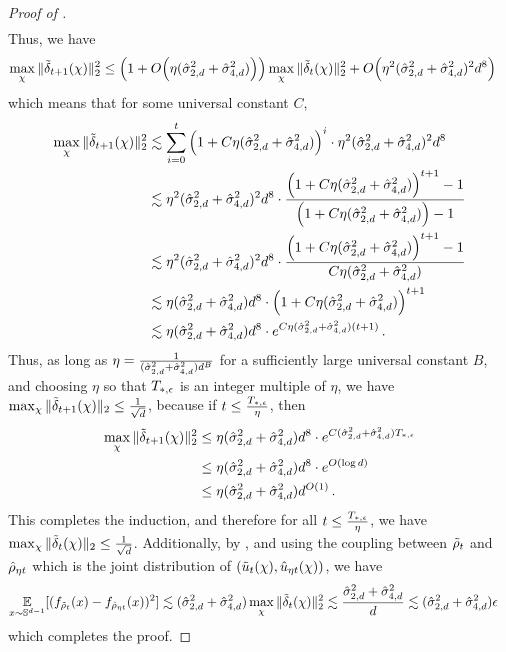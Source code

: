 \begin{proof}[Proof of ]
\begin{align}
\end{align}
Thus, we have
\begin{align}
\max_\chi \|{\tilde{\delta}}_{t + 1}(\chi)\|_2^2 
& \leq \Big(1 + O\Big(\eta (\hat{\sigma}_{2, d}^2 + \hat{\sigma}_{4, d}^2) \Big)\Big) \max_\chi \|{\tilde{\delta}}_t(\chi)\|_2^2 + O\Big(\eta^2 (\hat{\sigma}_{2, d}^2 + \hat{\sigma}_{4, d}^2)^2 d^8 \Big)
\end{align}
which means that for some universal constant $C$,
\begin{align}
\max_\chi \|{\tilde{\delta}}_{t + 1}(\chi)\|_2^2 
& \lesssim \sum_{i = 0}^{t} \Big(1 + C \eta (\hat{\sigma}_{2, d}^2 + \hat{\sigma}_{4, d}^2) \Big)^i \cdot \eta^2 (\hat{\sigma}_{2, d}^2 + \hat{\sigma}_{4, d}^2)^2 d^8 \\
& \lesssim \eta^2 (\hat{\sigma}_{2, d}^2 + \hat{\sigma}_{4, d}^2)^2 d^8 \cdot \frac{\Big(1 + C \eta (\hat{\sigma}_{2, d}^2 + \hat{\sigma}_{4, d}^2) \Big)^{t + 1} - 1}{\Big(1 + C \eta (\hat{\sigma}_{2, d}^2 + \hat{\sigma}_{4, d}^2) \Big) - 1} \\
& \lesssim \eta^2 (\hat{\sigma}_{2, d}^2 + \hat{\sigma}_{4, d}^2)^2 d^8 \cdot \frac{\Big(1 + C \eta (\hat{\sigma}_{2, d}^2 + \hat{\sigma}_{4, d}^2) \Big)^{t + 1} - 1}{C \eta (\hat{\sigma}_{2, d}^2 + \hat{\sigma}_{4, d}^2)} \\
& \lesssim \eta (\hat{\sigma}_{2, d}^2 + \hat{\sigma}_{4, d}^2) d^8 \cdot \Big(1 + C \eta (\hat{\sigma}_{2, d}^2 + \hat{\sigma}_{4, d}^2) \Big)^{t + 1} \\
& \lesssim \eta (\hat{\sigma}_{2, d}^2 + \hat{\sigma}_{4, d}^2) d^8 \cdot e^{C \eta (\hat{\sigma}_{2, d}^2 + \hat{\sigma}_{4, d}^2) (t + 1)} \,.
\label{eq:discretization_geometric_series_bound}
\end{align}
Thus, as long as $\eta = \frac{1}{(\hat{\sigma}_{2, d}^2 + \hat{\sigma}_{4, d}^2) d^B}$ for a sufficiently large universal constant $B$, and choosing $\eta$ so that $T_{*, \epsilon}$ is an integer multiple of $\eta$, we have $\max_\chi \|{\tilde{\delta}}_{t + 1}(\chi)\|_2 \leq \frac{1}{\sqrt{d}}$, because if $t \leq \frac{T_{*, \epsilon}}{\eta}$, then 
\begin{align}
\max_\chi \|{\tilde{\delta}}_{t + 1}(\chi)\|_2^2
& \leq \eta (\hat{\sigma}_{2, d}^2 + \hat{\sigma}_{4, d}^2) d^8 \cdot e^{C (\hat{\sigma}_{2, d}^2 + \hat{\sigma}_{4, d}^2) T_{*, \epsilon}} \\
& \leq \eta (\hat{\sigma}_{2, d}^2 + \hat{\sigma}_{4, d}^2) d^8 \cdot e^{O(\log d)} \\
& \leq \eta (\hat{\sigma}_{2, d}^2 + \hat{\sigma}_{4, d}^2) d^{O(1)} \,.
\end{align}
This completes the induction, and therefore for all $t \leq \frac{T_{*, \epsilon}}{\eta}$, we have $\max_\chi \|{\tilde{\delta}}_t(\chi) \|_2 \leq \frac{1}{\sqrt{d}}$. Additionally, by , and using the coupling between ${\tilde{\rho}}_t$ and ${\hat{\rho}}_{\eta t}$ which is the joint distribution of $(\tilde{u}_t(\chi), \hat{u}_{\eta t}(\chi))$, we have
\begin{align}
\operatorname*{\mathbb{E}}_{x \sim \mathbb{S}^{d - 1}} [(f_{{\tilde{\rho}}_t}(x) - f_{{\hat{\rho}}_{\eta t}}(x))^2]
& \lesssim (\hat{\sigma}_{2, d}^2 + \hat{\sigma}_{4, d}^2) \max_{\chi} \|{\tilde{\delta}}_t(\chi)\|_2^2 \lesssim \frac{\hat{\sigma}_{2, d}^2 + \hat{\sigma}_{4, d}^2}{d} \lesssim (\hat{\sigma}_{2, d}^2 + \hat{\sigma}_{4, d}^2) \epsilon
\end{align}
which completes the proof.
\end{proof}